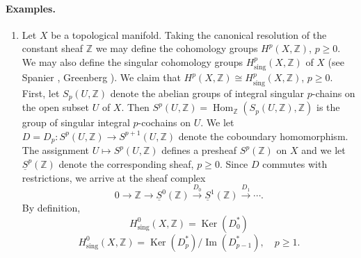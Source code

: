 \paragraph{Examples.}
\begin{enumerate}[start=3]
\item Let $X$ be a topological manifold. Taking the canonical resolution of the constant sheaf $\mathbb Z$ we may define the cohomology groups $H^p(X,\mathbb Z)$, $p\geq0$. We may also define the singular cohomology groups $H^p_{\mathrm{sing}}(X,\mathbb Z)$ of $X$ (see Spanier \cite{bib:II:spanier-e:1}, Greenberg \cite{bib:II:greenberg-m-j:1}). We claim that $H^p(X,\mathbb Z)\cong H^p_{\mathrm{sing}}(X,\mathbb Z)$, $p\geq0$. First, let $S_p(U,\mathbb Z)$ denote the abelian groups of integral singular $p$-chains on the open subset $U$ of $X$. Then $S^p(U,\mathbb Z)=\operatorname{Hom}_{\mathbb Z}(S_p(U,\mathbb Z),\mathbb Z)$ is the group of singular integral $p$-cochains on $U$. We let $D=D_p:S^p(U,\mathbb Z)\to S^{p+1}(U,\mathbb Z)$ denote the coboundary
homomorphism. The assignment $U\mapsto S^p(U,\mathbb Z)$ defines a presheaf $S^p(\mathbb Z)$ on $X$ and we let $\underline S^p(\mathbb Z)$ denote the corresponding sheaf, $p\geq0$. Since $D$ commutes with restrictions, we arrive at the sheaf complex
\begin{equation}\tag{A}\label{eq:6:a:2}
0\to\mathbb Z\to\underline S^0(\mathbb Z)\xrightarrow{D_0}\underline S^1(\mathbb Z)\xrightarrow{D_1}\cdots.
\end{equation}
By definition,
\[
H^0_{\mathrm{sing}}(X,\mathbb Z)=\operatorname{Ker}(D_0^*)
\]
\[
H^0_{\mathrm{sing}}(X,\mathbb Z)=\operatorname{Ker}(D_p^*)/\operatorname{Im}(D_{p-1}^*),\quad p\geq1.
\]

\end{enumerate}
